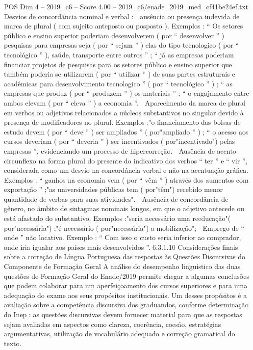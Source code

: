 \begin{textsample}{POS Dim 4 – 2019\_c6 – Score 4.00 – 2019\_c6/enade\_2019\_med\_cf41be24ef.txt}
Desvios de concordância nominal e verbal :  ausência ou presença indevida de marca de plural ( com sujeito anteposto ou posposto ).
Exemplos : “ Os setores público e ensino superior poderiam desenvolverem ( por “ desenvolver ” ) pesquisas para empresas seja ( por “ sejam ” ) elas do tipo tecnologico ( por “ tecnológico ” ), saúde, transporte entre outros ” ; “ já as empresas poderiam financiar projetos de pesquisas para os setores público e ensino superior que também poderia se utilizarem ( por “ utilizar ” ) de suas partes estruturais e acadêmicas para desenvolvimento tecnologico ” ( por “ tecnológico ” ) ; “ as empresas que produz ( por “ produzem ” ) os materiais ” ; “ o engajamento entre ambos elevam ( por “ eleva ” ) a economia ”.  Aparecimento da marca de plural em verbos ou adjetivos relacionados a núcleos substantivos no singular devido à presença de modificadores no plural.
Exemplos :"o financiamento das bolsas de estudo devem ( por “ deve ” ) ser ampliados ” ( por"ampliado ” ) ; “ o acesso aos cursos deveriam ( por “ deveria ” ) ser incentivados ( por"incentivado") pelas empresas ”, evidenciando um processo de hipercorreção.  Ausência de acento circunflexo na forma plural do presente do indicativo dos verbos “ ter ” e “ vir ”, considerada como um desvio na concordância verbal e não na acentuação gráfica.
Exemplos : “ ganhos na economia vem ( por “ vêm ” ) através dos aumentos com exportação ” ;"as universidades públicas tem ( por"têm") recebido menor quantidade de verbas para suas atividades".  Ausência de concordância de gênero, no âmbito de sintagmas nominais longos, em que o adjetivo antecede ou está afastado do substantivo.
Exemplos :"seria necessário uma reeducação"( por"necessária") ;"é necessário ( por"necessária") a mobilização";  Emprego de “ onde ” não locativo.
Exemplo : “ Com isso o custo seria inferior ao comprador, onde iria igualar aos países mais desenvolvidos ”. 6.3.1.10 Considerações finais sobre a correção de Língua Portuguesa das respostas às Questões Discursivas do Componente de Formação Geral A análise do desempenho linguístico das duas questões de Formação Geral do Enade/2019 permite chegar a algumas conclusões que podem colaborar para um aperfeiçoamento dos cursos superiores e para uma adequação do exame aos seus propósitos institucionais.
Um desses propósitos é a avaliação sobre a competência discursiva dos graduandos, conforme determinação do Inep : as questões discursivas devem fornecer material para que as respostas sejam avaliadas em aspectos como clareza, coerência, coesão, estratégias argumentativas, utilização de vocabulário adequado e correção gramatical do texto.

\end{textsample}
